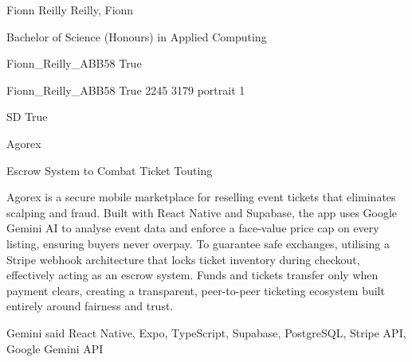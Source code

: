 
\begingroup{}\relax



\def\Key{Fionn_Reilly_ABB58}

{Fionn Reilly}
{Reilly, Fionn}

{Bachelor of Science (Honours) in Applied Computing}

{Fionn_Reilly_ABB58}
{True}

{Fionn_Reilly_ABB58}
{True}
{2245}
{3179}
{portrait}
{1}

{SD}
{True}

{Agorex}

{Escrow System to Combat Ticket Touting}

{Agorex is a secure mobile marketplace for reselling event tickets that eliminates scalping and fraud. Built with React Native and Supabase, the app uses Google Gemini AI to analyse event data and enforce a face-value price cap on every listing, ensuring buyers never overpay. To guarantee safe exchanges, utilising a Stripe webhook architecture that locks ticket inventory during checkout, effectively acting as an escrow system. Funds and tickets transfer only when payment clears, creating a transparent, peer-to-peer ticketing ecosystem built entirely around fairness and trust.}

{Gemini said React Native, Expo, TypeScript, Supabase, PostgreSQL, Stripe API, Google Gemini API}

